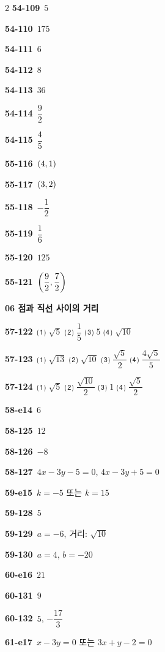 \documentclass[10pt,a4paper]{article}
\begin{document}
\begin{multicols}{2}
\noindent\textbf{54-109}\ $5$\par
\noindent\textbf{54-110}\ $175$\par
\noindent\textbf{54-111}\ $6$\par
\noindent\textbf{54-112}\ $8$\par
\noindent\textbf{54-113}\ $36$\par
\noindent\textbf{54-114}\ $\dfrac{9}{2}$\par
\noindent\textbf{54-115}\ $\dfrac{4}{5}$\par
\noindent\textbf{55-116}\ $(4{,}\mkern3mu\mathopen{}1)$\par
\noindent\textbf{55-117}\ $(3{,}\mkern3mu\mathopen{}2)$\par
\noindent\textbf{55-118}\ $-\dfrac{1}{2}$\par
\noindent\textbf{55-119}\ $\dfrac{1}{6}$\par
\noindent\textbf{55-120}\ $125$\par
\noindent\textbf{55-121}\ $\left(\dfrac{9}{2}{,}\mkern3mu\mathopen{}\dfrac{7}{2}\right)$\par
\noindent\textbf{06 점과 직선 사이의 거리}\par\smallskip
\noindent\textbf{57-122}\ ⑴ $\sqrt{5}$ ⑵ $\dfrac{1}{5}$ ⑶ $5$ ⑷ $\sqrt{10}$\par
\noindent\textbf{57-123}\ ⑴ $\sqrt{13}$ ⑵ $\sqrt{10}$ ⑶ $\dfrac{\sqrt{5}}{2}$ ⑷ $\dfrac{4\sqrt{5}}{5}$\par
\noindent\textbf{57-124}\ ⑴ $\sqrt{5}$ ⑵ $\dfrac{\sqrt{10}}{2}$ ⑶ $1$ ⑷ $\dfrac{\sqrt{5}}{2}$\par
\noindent\textbf{58-e14}\ $6$\par
\noindent\textbf{58-125}\ $12$\par
\noindent\textbf{58-126}\ $-8$\par
\noindent\textbf{58-127}\ $4x-3y-5=0$, $4x-3y+5=0$\par
\noindent\textbf{59-e15}\ $k=-5$ 또는 $k=15$\par
\noindent\textbf{59-128}\ $5$\par
\noindent\textbf{59-129}\ $a=-6$, 거리: $\sqrt{10}$\par
\noindent\textbf{59-130}\ $a=4$, $b=-20$\par
\noindent\textbf{60-e16}\ $21$\par
\noindent\textbf{60-131}\ $9$\par
\noindent\textbf{60-132}\ $5$, $-\dfrac{17}{3}$\par
\noindent\textbf{61-e17}\ $x-3y=0$ 또는 $3x+y-2=0$\par

\end{multicols}
\end{document}
